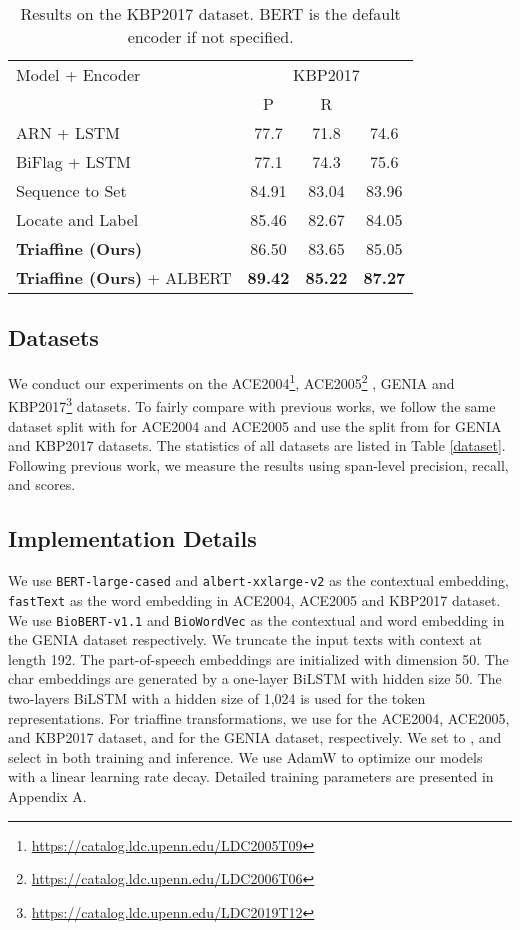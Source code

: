 \documentclass[11pt]{article}
\begin{document}
\begin{table}[t]
\centering
\small
\begin{tabular}{lccc}
\toprule
Model + Encoder & \multicolumn{3}{c}{KBP2017}  \\
& P & R &  \\
\midrule
ARN + LSTM & 77.7 & 71.8 & 74.6 \\
BiFlag + LSTM & 77.1 & 74.3 & 75.6 \\
Sequence to Set & 84.91 & 83.04 & 83.96  \\
Locate and Label & 85.46 & 82.67 & 84.05 \\
\midrule
{\bf Triaffine (Ours)} & 86.50 & 83.65 & 85.05 \\
{\bf Triaffine (Ours)} + ALBERT & \textbf{89.42} & \textbf{85.22} & \textbf{87.27}  \\
\bottomrule
\end{tabular}
\caption{Results on the KBP2017 dataset. BERT is the default encoder if not specified.}
\label{main kbp}
\end{table}


\subsection{Datasets}
We conduct our experiments on the ACE2004\footnote{\url{https://catalog.ldc.upenn.edu/LDC2005T09}}, ACE2005\footnote{\url{https://catalog.ldc.upenn.edu/LDC2006T06}} \cite{ace04}, GENIA \cite{kim2003genia} and KBP2017\footnote{\url{https://catalog.ldc.upenn.edu/LDC2019T12}} \cite{ji2017overview} datasets.
To fairly compare with previous works, we follow the same dataset split with \citet{lu2015joint} for ACE2004 and ACE2005 and use the split from \citet{lin2019sequence} for GENIA and KBP2017 datasets.
The statistics of all datasets are listed in Table \ref{dataset}.
Following previous work, we measure the results using span-level precision, recall, and  scores.


\subsection{Implementation Details} \label{detail}
We use \texttt{BERT-large-cased} \cite{devlin-etal-2019-bert} and \texttt{albert-xxlarge-v2} \cite{lan2019albert} as the contextual embedding, \texttt{fastText} \cite{fasttext} as the word embedding in ACE2004, ACE2005 and KBP2017 dataset.
We use \texttt{BioBERT-v1.1} \cite{lee2020biobert} and \texttt{BioWordVec} \cite{zhang2019biowordvec}
as the contextual and word embedding in the GENIA dataset respectively.
We truncate the input texts with context at length 192.
The part-of-speech embeddings are initialized with dimension 50. The char embeddings are generated by a one-layer BiLSTM with hidden size 50.
The two-layers BiLSTM with a hidden size of 1,024 is used for the token representations.
For triaffine transformations, we use  for the ACE2004, ACE2005, and KBP2017 dataset, and  for the GENIA dataset, respectively.
We set  to , and  select  in both training and inference.
We use AdamW \cite{loshchilov2017decoupled} to optimize our models with a linear learning rate decay.
Detailed training parameters are presented in Appendix A.
\end{document}
